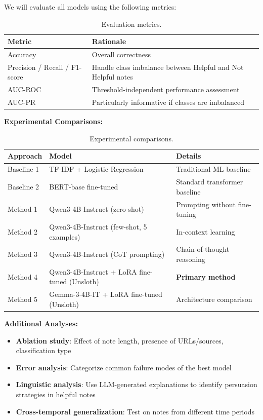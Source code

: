 \documentclass[12pt, a4paper]{article}
\begin{document}
We will evaluate all models using the following metrics:

\begin{table}[h!]
\centering
\begin{tabularx}{\textwidth}{l X}
\toprule
\textbf{Metric} & \textbf{Rationale} \\
\midrule
Accuracy & Overall correctness \\
Precision / Recall / F1-score & Handle class imbalance between Helpful and Not Helpful notes \\
AUC-ROC & Threshold-independent performance assessment \\
AUC-PR & Particularly informative if classes are imbalanced \\
\bottomrule
\end{tabularx}
\caption{Evaluation metrics.}
\label{tab:metrics}
\end{table}

\noindent\textbf{Experimental Comparisons:}

\begin{table}[h!]
\centering
\begin{tabularx}{\textwidth}{l l X}
\toprule
\textbf{Approach} & \textbf{Model} & \textbf{Details} \\
\midrule
Baseline 1 & TF-IDF + Logistic Regression & Traditional ML baseline \\
Baseline 2 & BERT-base fine-tuned & Standard transformer baseline \\
Method 1 & Qwen3-4B-Instruct (zero-shot) & Prompting without fine-tuning \\
Method 2 & Qwen3-4B-Instruct (few-shot, 5 examples) & In-context learning \\
Method 3 & Qwen3-4B-Instruct (CoT prompting) & Chain-of-thought reasoning \\
Method 4 & Qwen3-4B-Instruct + LoRA fine-tuned (Unsloth) & \textbf{Primary method} \\
Method 5 & Gemma-3-4B-IT + LoRA fine-tuned (Unsloth) & Architecture comparison \\
\bottomrule
\end{tabularx}
\caption{Experimental comparisons.}
\label{tab:experiments}
\end{table}

\noindent\textbf{Additional Analyses:}
\begin{itemize}[nosep]
    \item \textbf{Ablation study}: Effect of note length, presence of URLs/sources, classification type
    \item \textbf{Error analysis}: Categorize common failure modes of the best model
    \item \textbf{Linguistic analysis}: Use LLM-generated explanations to identify persuasion strategies in helpful notes
    \item \textbf{Cross-temporal generalization}: Test on notes from different time periods
\end{itemize}
\end{document}
